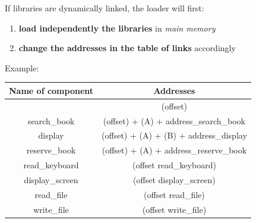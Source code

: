 \documentclass{beamer}[10pt, usepdftitle=false, handout]
\begin{document}
	\begin{frame}
	
	If libraries are dynamically linked, the loader will first:
	\vspace*{1em}
	\begin{enumerate}
	\item{\textbf{load independently the libraries} in \textit{main memory}}
	\item{\textbf{change the addresses in the table of links} accordingly}
	\end{enumerate}		
	
	\vspace*{1em}
	Example:
	\vspace*{1em}
		\begin{center}
	\scalebox{0.6} {
	\begin{tabular}{|c|c|}
	\hline
	\textbf{Name of component} & \textbf{Addresses} \\ \hline
				  & (offset) \\ \hline
	search\_book & (offset) + (A) + address\_search\_book \\ \hline
	display & (offset) + (A) + (B) + address\_display \\ \hline
	reserve\_book & (offset) + (A) + address\_reserve\_book \\ \hline
	read\_keyboard & (offset read\_keyboard) \\ \hline
	display\_screen & (offset display\_screen) \\ \hline
	read\_file & (offset read\_file) \\ \hline
	write\_file & (offset write\_file) \\ \hline
	\end{tabular}
	}	
	\end{center}
	\end{frame}
\end{document}

